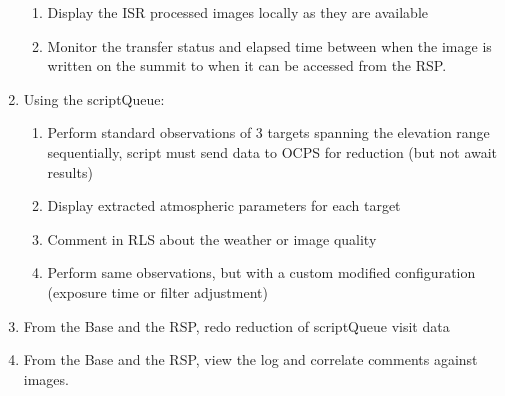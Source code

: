 \begin{enumerate}
\begin{enumerate}
		\item Display the \gls{ISR} processed images locally as they are available
		\item Monitor the transfer status and elapsed time between when the image is written on the summit to when it can be accessed from the \gls{RSP}.
	\end{enumerate}	
	\item Using the scriptQueue:
		\begin{enumerate}
			\item Perform standard observations of 3 targets spanning the elevation range sequentially, script must send data to \gls{OCPS} for reduction (but not await results)
			\item Display extracted atmospheric parameters for each target %
			\item Comment in \gls{RLS} about the weather or image quality
			\item Perform same observations, but with a custom modified configuration (exposure time or filter adjustment)
		\end{enumerate}
	\item From the Base and the \gls{RSP}, redo reduction of scriptQueue visit data
	\item From the Base and the \gls{RSP}, view the log and correlate comments against images.
\end{enumerate}
